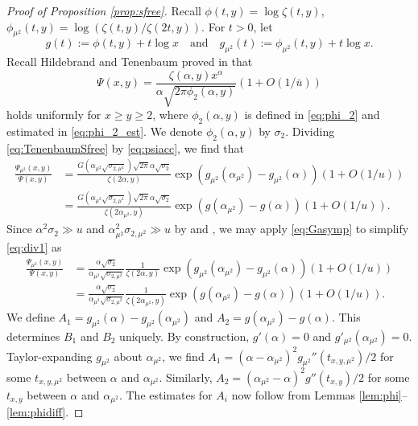 \documentclass{amsart}
\theoremstyle{plain}
\theoremstyle{remark}
\newcommand{\ubar}{\bar{u}}
\begin{document}
\begin{proof}[Proof of Proposition \ref{prop:sfree}]
	Recall $\phi(t,y)= \log \zeta(t,y)$, $\phi_{\mu^2}(t,y) = \log (\zeta(t,y)/\zeta(2t,y))$. For $t>0$, let \[g(t) := \phi(t,y)+t \log x \quad \text{and}\quad g_{\mu^2}(t) := \phi_{\mu^2}(t,y)+t\log x.\]
	Recall Hildebrand and Tenenbaum proved in \cite[Thm.~1]{HildebrandTenenbaum1986} that
	\begin{equation}\label{eq:psiacc}
		\Psi(x,y) = \frac{\zeta(\alpha,y)x^{\alpha}}{\alpha\sqrt{2\pi \phi_2(\alpha,y)}}(1+O(1/\ubar))
	\end{equation}
	holds uniformly for $x \ge y \ge 2$,  where $\phi_2(\alpha,y)$ is defined in \eqref{eq:phi_2} and estimated in \eqref{eq:phi_2_est}. We denote $\phi_2(\alpha,y)$ by $\sigma_2$. Dividing \eqref{eq:TenenbaumSfree} by \eqref{eq:psiacc}, we find that
	\begin{equation}\label{eq:div1}
		\begin{split}
			\frac{\Psi_{\mu^2}(x,y)}{\Psi(x,y)}
			&=\frac{G(\alpha_{\mu^2}\sqrt{\sigma_{2,\mu^2}}) \sqrt{2\pi}\alpha\sqrt{\sigma_2}}{\zeta(2\alpha,y)}\exp( g_{\mu^2}(\alpha_{\mu^2})-g_{\mu^2}(\alpha))  (1+O(1/u))\\
			&=\frac{G(\alpha_{\mu^2}\sqrt{\sigma_{2,\mu^2}}) \sqrt{2\pi}\alpha\sqrt{\sigma_2}}{\zeta(2\alpha_{\mu^2},y)}\exp( g(\alpha_{\mu^2})-g(\alpha))  (1+O(1/u)).
		\end{split}
	\end{equation}
	Since $\alpha^2 \sigma_2 \gg u$ and $\alpha_{\mu^2}^2 \sigma_{2,\mu^2} \gg u$ by  \cite[Thm.~2]{HildebrandTenenbaum1986} and \cite[Lems.~2.8--2.9]{TenenbaumSfree}, we may apply \eqref{eq:Gasymp} to simplify \eqref{eq:div1} as
	\begin{equation}\label{eq:div2}
		\begin{split}
			\frac{\Psi_{\mu^2}(x,y)}{\Psi(x,y)} &=\frac{\alpha \sqrt{\sigma_2}}{\alpha_{\mu^2}\sqrt{\sigma_{2,\mu^2}}}\frac{1}{\zeta(2\alpha,y)}\exp( g_{\mu^2}(\alpha_{\mu^2})-g_{\mu^2}(\alpha))  (1+O(1/u))\\
			&=\frac{\alpha \sqrt{\sigma_2}}{\alpha_{\mu^2}\sqrt{\sigma_{2,\mu^2}}}\frac{1}{\zeta(2\alpha_{\mu^2},y)}\exp( g(\alpha_{\mu^2})-g(\alpha))  (1+O(1/u)).
		\end{split}
	\end{equation}
	We define $A_1=g_{\mu^2}(\alpha)-g_{\mu^2}(\alpha_{\mu^2})$ and  $A_2=g(\alpha_{\mu^2})-g(\alpha)$. This determines $B_1$ and $B_2$ uniquely. By construction, $g'(\alpha)=0$ and $g'_{\mu^2}(\alpha_{\mu^2})=0$. 
	Taylor-expanding $g_{\mu^2}$ about $\alpha_{\mu^2}$, we find $A_1 = (\alpha-\alpha_{\mu^2})^2 g_{\mu^2}''(t_{x,y,\mu^2})/2$ for some $t_{x,y,\mu^2}$ between $\alpha$ and $\alpha_{\mu^2}$. Similarly,  $A_2 = (\alpha_{\mu^2}-\alpha)^2 g''(t_{x,y})/2$ for some $t_{x,y}$ between $\alpha$ and $\alpha_{\mu^2}$. The estimates for $A_i$ now follow from Lemmas \ref{lem:phi}--\ref{lem:phidiff}.
	

\end{proof}
\end{document}
